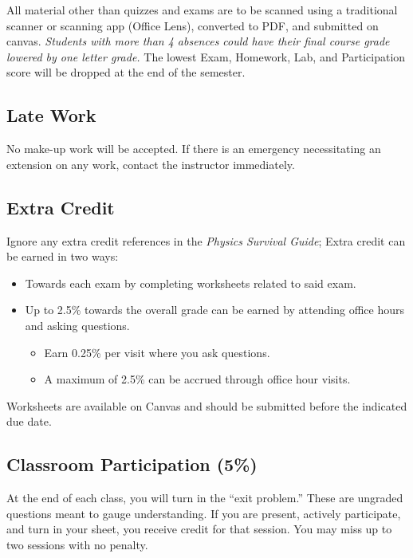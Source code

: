 \documentclass[12pt]{article}
\begin{document}
\noindent
All material other than quizzes and exams are to be scanned using a traditional scanner or scanning app (Office Lens), converted to PDF, and submitted on canvas.
\emph{Students with more than 4 absences could have their final course grade lowered by one letter grade.}
The lowest Exam, Homework, Lab, and Participation score will be dropped at the end of the semester. 

\subsection*{Late Work}
No make-up work will be accepted. 
If there is an emergency necessitating an extension on any work, contact the instructor immediately. 

\subsection*{Extra Credit}
Ignore any extra credit references in the \emph{Physics Survival Guide}; 
Extra credit can be earned in two ways:
\begin{itemize}
\item Towards each exam by completing worksheets related to said exam. 
\item Up to 2.5\% towards the overall grade can be earned by attending office hours and asking questions.  
\begin{itemize}
    \item Earn 0.25\% per visit where you ask questions.
    \item A maximum of 2.5\% can be accrued through office hour visits.
\end{itemize}
\end{itemize}

\noindent
Worksheets are available on Canvas and should be submitted before the indicated due date.

\subsection*{Classroom Participation (5\%)}
At the end of each class, you will turn in the “exit problem.” These are ungraded questions meant to gauge understanding. If you are present, actively participate, and turn in your sheet, you receive credit for that session. You may miss up to two sessions with no penalty.
\end{document}
